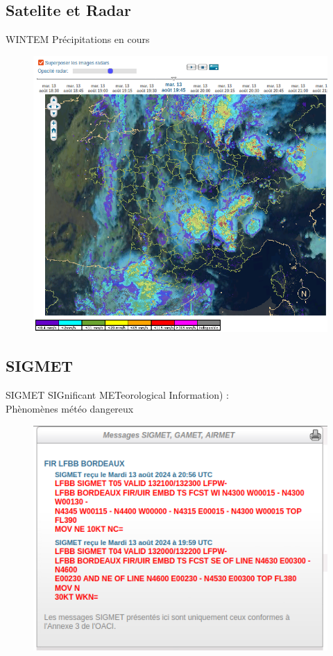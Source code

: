 \documentclass{beamer}
\begin{document}
\subsection{Satelite et Radar}
\begin{frame}{WINTEM}
  Précipitations en cours
  \pause
  \begin{figure}
    \centering
    \includegraphics[scale=0.7]{images/satelite.png}
  \end{figure}
\end{frame}

\subsection{SIGMET}
\begin{frame}{SIGMET}
  SIGnificant METeorological Information) : \\Phènomènes météo dangereux
  \pause
  \begin{figure}
    \centering
    \includegraphics[scale=1.5]{images/sigmet.png}
  \end{figure}
\end{frame}
\end{document}
